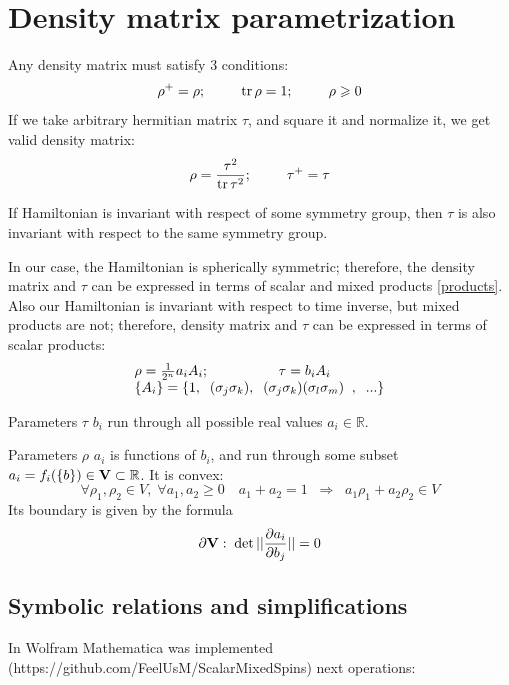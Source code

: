 \documentclass[a4paper]{jpconf}
\renewcommand\[{\begin{equation}}
\renewcommand\]{\end{equation}}
\begin{document}
\section{Density matrix parametrization\cite{SqParam}}
Any density matrix must satisfy 3 conditions:
\[{\rho ^ + } = \rho ;\qquad \mathop{\rm{tr}}\rho  = 1;\qquad  \rho  \geqslant 0\]
If we take arbitrary hermitian matrix $\tau$, and square it and normalize it, we get valid density matrix:
\[\rho  = \frac{{{\tau ^2}}}{{\mathop{\rm{tr}}{\tau ^2}}};\qquad {\tau ^ + } = \tau \]

If Hamiltonian is invariant with respect of some symmetry group, then $\tau$ is also invariant with respect to the same symmetry group.

In our case, the Hamiltonian is spherically symmetric; therefore, the density matrix and $\tau$ can be expressed in terms of scalar and mixed products \eqref{products}.
Also our Hamiltonian is invariant with respect to time inverse, but mixed products are not; therefore, density matrix and $\tau$ can be expressed in terms of scalar products:
\[\begin{array}{l}
\rho  = \frac{1}{2^n} a_i A_i;\qquad \qquad \tau  = b_i A_i
\\
\{ A_i \}  = \{ 1,  \;\;({\bf \sigma}_j{\bf\sigma}_k), \;\;
({\bf \sigma}_j{\bf\sigma}_k)({\bf \sigma}_l{\bf\sigma}_m)\;\;,\;\;...\} 
\end{array}\]

Parameters $\tau$ $b_i$ run through all possible real values $a_i \in {\mathbb R}$.

Parameters $\rho$ $a_i$ is functions of $b_i$, and run through some subset ${a_i} = {f_i}(\{ b\} ) \in {\bf{V}} \subset {\mathbb R}$.
It is convex:
\[\forall {\rho _1},{\rho _2} \in V,\;\forall {a_1},{a_2} \ge 0\quad {a_1} + {a_2} = 1\;\; \Rightarrow \;\;{a_1}{\rho _1} + {a_2}{\rho _2} \in V\]
Its boundary is given by the formula
\[\partial {\bf{V}}:\;\det ||\frac{{\partial {a_i}}}{{\partial {b_j}}}|| = 0\]

\subsection{Symbolic relations and simplifications}
In Wolfram Mathematica was implemented (https://github.com/FeelUsM/ScalarMixedSpins) next operations:
\end{document}
